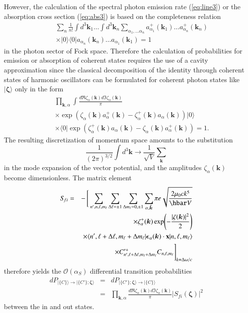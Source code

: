 \documentclass[final,3p,times,twocolumn]{elsarticle3}
\begin{document}
However, the calculation of the spectral photon emission rate
(\ref{eq:line3}) or the absorption cross section (\ref{eq:abs3})
is based on the completeness relation
\begin{eqnarray*}
&&\!\!\!\sum_n\frac{1}{n!}
\int\!d^3\bm{k}_1\ldots\int\!d^3\bm{k}_n
\sum_{\alpha_1,\ldots\alpha_n}a_{\alpha_1}^+(\bm{k}_1)\ldots a_{\alpha_n}^+(\bm{k}_n)
\\
&&\times\bm{|}0\bm{\rangle}
\bm{\langle} 0\bm{|} a_{\alpha_n}(\bm{k}_n)\ldots a_{\alpha_1}(\bm{k}_1)
=1
\end{eqnarray*}
in the photon sector of Fock space. Therefore the calculation of probabilities
for emission or absorption of coherent states requires the use of a cavity 
approximation since the classical decomposition of the identity through coherent 
states of harmonic oscillators can be formulated for coherent photon states
like $\bm{|}\bm{\zeta}\bm{\rangle}$ only in the form
\begin{eqnarray}\nonumber
&&\!\!\!\prod_{\bm{k},\alpha}\int\frac{d\Re\zeta_\alpha(\bm{k})
d\Im\zeta_\alpha(\bm{k})}{\pi}
\\ \nonumber
&&\times\exp\!\left(\zeta_\alpha(\bm{k})a_{\alpha}^+(\bm{k})
-\zeta_{\alpha}^+(\bm{k})a_\alpha(\bm{k})\right)
\bm{|}0\bm{\rangle}
\\ \label{eq:complete2}
&&\times
\bm{\langle} 0\bm{|}\exp\!\left(\zeta^+_\alpha(\bm{k})a_{\alpha}(\bm{k})
-\zeta_{\alpha}(\bm{k})a^+_\alpha(\bm{k})\right)=1.
\end{eqnarray}
The resulting discretization of momentum space amounts to the
substitution 
\[
\frac{1}{(2\pi)^{3/2}}\int\!d^3\bm{k}\to\frac{1}{\sqrt{V}}\sum_{\bm{k}}
\]
in the mode expansion of the vector potential,
and the amplitudes $\zeta_\alpha(\bm{k})$ become dimensionless.
The matrix element
\begin{eqnarray}\nonumber
S_{\!fi}&=&-\,\Bigg[\sum_{n',n,\ell,m_\ell}\sum_{\Delta\ell=\pm 1}\sum_{\Delta m_\ell=0,\pm 1}
\sum_{\alpha,\hat{\bm{k}}} \pi e\sqrt{\frac{2\mu_0 ck^5}{\hbar V}}
\\ \nonumber
&&\times
\zeta^+_\alpha(\bm{k})
\exp\!\left(-\frac{|\zeta(\bm{k})|^2}{2}\right)
\\ \nonumber
&&\times
\langle n',\ell+\Delta\ell,m_\ell+\Delta m_\ell|
\bm{\epsilon}_\alpha(\bm{k})\cdot\mathrm{\bf x}|n,\ell,m_\ell\rangle
\\ \label{eq:linec4}
&&\times
C'^+_{n',\ell+\Delta\ell,m_\ell+\Delta m_\ell}C_{n,\ell,m_\ell}\Bigg]_{k=\Delta\omega/c}
\end{eqnarray}
therefore yields the $\mathcal{O}(\alpha_S)$ differential
transition probabilities
\begin{eqnarray}\nonumber
dP_{\bm{|}\{C\}\bm{\rangle}\to\bm{|}\{C'\};\bm{\zeta}\bm{\rangle}}&=&
dP_{\bm{|}\{C'\};\bm{\zeta}\bm{\rangle}\to\bm{|}\{C\}\bm{\rangle}}
\\ \label{eq:Pfi}
&=&\prod_{\bm{k},\alpha}\!\frac{d\Re\zeta_\alpha(\bm{k})
d\Im\zeta_\alpha(\bm{k})}{\pi}\!\left|S_{\!fi}(\bm{\zeta})\right|^2
\end{eqnarray}
between the in and out states.
\end{document}
